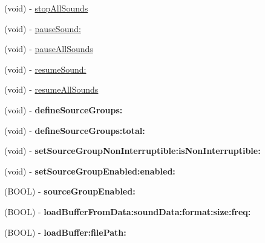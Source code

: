 \begin{DoxyCompactItemize}
\item 
(void) -\/ \hyperlink{interfaceCDSoundEngine_a8bbc63632a5e72c9235c39730e8efb38}{stop\+All\+Sounds}
\item 
(void) -\/ \hyperlink{interfaceCDSoundEngine_afd1f581938bf541447eaa9430712fff7}{pause\+Sound\+:}
\item 
(void) -\/ \hyperlink{interfaceCDSoundEngine_ac84ad4fe69381aa32b836f8a3a1b5e1f}{pause\+All\+Sounds}
\item 
(void) -\/ \hyperlink{interfaceCDSoundEngine_ad5ce097385bf2a6a347f418bfcbfeb54}{resume\+Sound\+:}
\item 
(void) -\/ \hyperlink{interfaceCDSoundEngine_a307f8d30e7fb5c7f29edbaea19709741}{resume\+All\+Sounds}
\item 
\mbox{\label{interfaceCDSoundEngine_a5940b79595deabff5cab67987133c518}} 
(void) -\/ {\bfseries define\+Source\+Groups\+:}
\item 
\mbox{\label{interfaceCDSoundEngine_a34ecd46964f13229c005cec18092be9f}} 
(void) -\/ {\bfseries define\+Source\+Groups\+:total\+:}
\item 
\mbox{\label{interfaceCDSoundEngine_afd29660acffd4fd1f7a667e4a389f84a}} 
(void) -\/ {\bfseries set\+Source\+Group\+Non\+Interruptible\+:is\+Non\+Interruptible\+:}
\item 
\mbox{\label{interfaceCDSoundEngine_ae791fe92a23a27d282fff5108ed8b8c0}} 
(void) -\/ {\bfseries set\+Source\+Group\+Enabled\+:enabled\+:}
\item 
\mbox{\label{interfaceCDSoundEngine_a9e73b1f9ce070579469e18da0fdabf5a}} 
(B\+O\+OL) -\/ {\bfseries source\+Group\+Enabled\+:}
\item 
\mbox{\label{interfaceCDSoundEngine_ad55fe00fbd360d99e3832047dc6f668c}} 
(B\+O\+OL) -\/ {\bfseries load\+Buffer\+From\+Data\+:sound\+Data\+:format\+:size\+:freq\+:}
\item 
\mbox{\label{interfaceCDSoundEngine_a6b28868545d700c3cc40d087527c6012}} 
(B\+O\+OL) -\/ {\bfseries load\+Buffer\+:file\+Path\+:}
\item 
\mbox{\label{interfaceCDSoundEngine_a8ab83905d8865c75c8055871f5c84fdd}} 

\end{DoxyCompactItemize}
